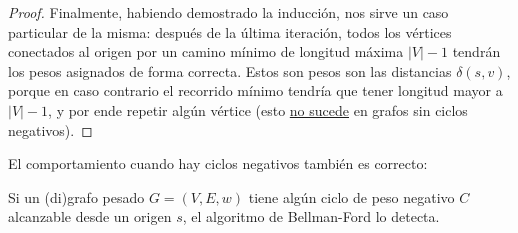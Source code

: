 \begin{proof}
    Finalmente, habiendo demostrado la inducción, nos sirve un caso particular de la misma: después de la última iteración, todos los vértices conectados al origen por un camino mínimo de longitud máxima $|V| - 1$ tendrán los pesos asignados de forma correcta. Estos son pesos son las distancias $\delta(s, v)$, porque en caso contrario el recorrido mínimo tendría que tener longitud mayor a $|V| - 1$, y por ende repetir algún vértice (esto \hyperref[teorema-ciclos-negativos]{no sucede} en grafos sin ciclos negativos).

\end{proof}

El comportamiento cuando hay ciclos negativos también es correcto:

\begin{theorem*}
    Si un (di)grafo pesado $G = (V, E, w)$ tiene algún ciclo de peso negativo $C$ alcanzable desde un origen $s$, el algoritmo de Bellman-Ford lo detecta.
\end{theorem*}
